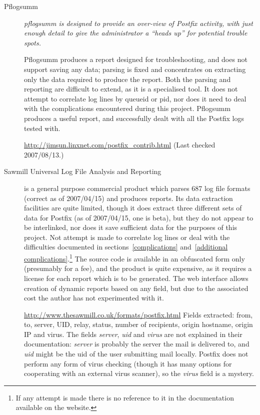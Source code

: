 \documentclass[a4paper,12pt,draft]{article}
\begin{document}
\begin{description}

    \item [Pflogsumm] \textit{pflogsumm is designed to provide an over-view
        of Postfix activity, with just enough detail to give the
        administrator a ``heads up'' for potential trouble spots.\/}

        Pflogsumm produces a report designed for troubleshooting, and does
        not support saving any data; parsing is fixed and concentrates on
        extracting only the data required to produce the report.  Both the
        parsing and reporting are difficult to extend, as it is a
        specialised tool.  It does not attempt to correlate log lines by
        queueid or pid, nor does it need to deal with the complications
        encountered during this project.  Pflogsumm produces a useful
        report, and successfully dealt with all the Postfix logs tested
        with.

        \url{http://jimsun.linxnet.com/postfix_contrib.html}
        \newline (Last checked 2007/08/13.)

    \item [Sawmill Universal Log File Analysis and Reporting] is a general
        purpose commercial product which parses 687 log file formats
        (correct as of 2007/04/15) and produces reports.  Its data
        extraction facilities are quite limited, though it does extract
        three different sets of data for Postfix (as of 2007/04/15, one is
        beta), but they do not appear to be interlinked, nor does it save
        sufficient data for the purposes of this project.  Not attempt is
        made to correlate log lines or deal with the difficulties
        documented in sections~\ref{complications} and~\ref{additional
        complications}.\footnote{If any attempt is made there is no
        reference to it in the documentation available on the website.}
        The source code is available in an obfuscated form only (presumably
        for a fee), and the product is quite expensive, as it requires a
        license for each report which is to be generated.  The web
        interface allows creation of dynamic reports based on any field,
        but due to the associated cost the author has not experimented with
        it.

        \url{http://www.thesawmill.co.uk/formats/postfix.html} \newline
        Fields extracted: from, to, server, UID, relay, status, number of
        recipients, origin hostname, origin IP and virus.  The fields
        \textit{server}, \textit{uid\/} and \textit{virus\/} are not
        explained in their documentation: \textit{server\/} is probably the
        server the mail is delivered to, and \textit{uid\/} might be the
        uid of the user submitting mail locally.  Postfix does not perform
        any form of virus checking (though it has many options for
        cooperating with an external virus scanner), so the
        \textit{virus\/} field is a mystery.


\end{description}
\end{document}
